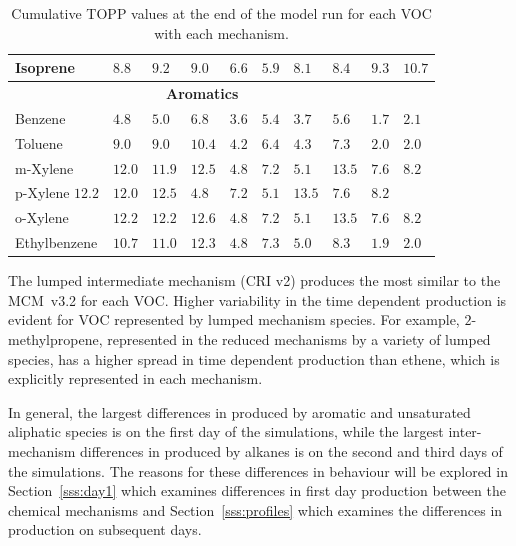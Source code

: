 {\begin{table}
\begin{center}
\begin{tabular}{llllllllll}
                Isoprene & $8.8$ & $9.2$ & $9.0$ & $6.6$ & $5.9$ & $8.1$ & $8.4$ & $9.3$ & $10.7$ \\ \hline
                \multicolumn{9}{c}{\textbf{Aromatics}} \\ \hline 
                Benzene & $4.8$ & $5.0$ & $6.8$ & $3.6$ & $5.4$ & $3.7$ & $5.6$ & $1.7$ & $2.1$ \\
                Toluene & $9.0$ & $9.0$ & $10.4$ & $4.2$ & $6.4$ & $4.3$ & $7.3$ & $2.0$ & $2.0$ \\
                m-Xylene & $12.0$ & $11.9$ & $12.5$ & $4.8$ & $7.2$ & $5.1$ & $13.5$ & $7.6$ & $8.2$ \\
                p-Xylene $12.2$ & $12.0$ & $12.5$ & $4.8$ & $7.2$ & $5.1$ & $13.5$ & $7.6$ & $8.2$ \\
                o-Xylene & $12.2$ & $12.2$ & $12.6$ & $4.8$ & $7.2$ & $5.1$ & $13.5$ & $7.6$ & $8.2$ \\
                Ethylbenzene & $10.7$ & $11.0$ & $12.3$ & $4.8$ & $7.3$ & $5.0$ & $8.3$ & $1.9$ & $2.0$ \\
                \hline \hline
            \end{tabular}%
            \caption{Cumulative TOPP values at the end of the model run for each VOC with each mechanism.}%
            \label{t:cumulative_TOPPs}%
        \end{center}%
    \end{table}%
}

The lumped intermediate mechanism (CRI v2) produces the most similar  to the \mbox{MCM v3.2} for each VOC.
Higher variability in the time dependent  production is evident for VOC represented by lumped mechanism species.
For example, $2$-methylpropene, represented in the reduced mechanisms by a variety of lumped species, has a higher spread in time dependent  production than ethene, which is explicitly represented in each mechanism.

In general, the largest differences in  produced by aromatic and unsaturated aliphatic species is on the first day of the simulations, while the largest inter-mechanism differences in  produced by alkanes is on the second and third days of the simulations.
The reasons for these differences in behaviour will be explored in \mbox{Section \ref{sss:day1}} which examines differences in first day  production between the chemical mechanisms and \mbox{Section \ref{sss:profiles}} which examines the differences in  production on subsequent days.
%
